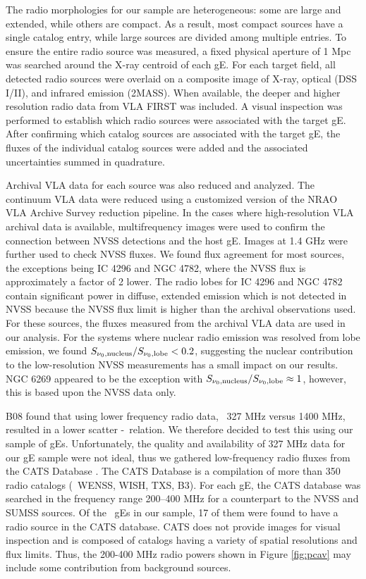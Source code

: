 \documentclass{emulateapj}
\begin{document}
The radio morphologies for our sample are heterogeneous: some are
large and extended, while others are compact. As a result, most
compact sources have a single catalog entry, while large sources are
divided among multiple entries. To ensure the entire radio source was
measured, a fixed physical aperture of 1 Mpc was searched around the
X-ray centroid of each gE. For each target field, all detected radio
sources were overlaid on a composite image of X-ray, optical (DSS
I/II), and infrared emission (2MASS). When available, the deeper and
higher resolution radio data from VLA FIRST was included. A visual
inspection was performed to establish which radio sources were
associated with the target gE. After confirming which catalog sources
are associated with the target gE, the fluxes of the individual
catalog sources were added and the associated uncertainties summed in
quadrature.

Archival VLA data for each source was also reduced and analyzed. The
continuum VLA data were reduced using a customized version of the NRAO
VLA Archive Survey reduction pipeline. In the cases where
high-resolution VLA archival data is available, multifrequency images
were used to confirm the connection between NVSS detections and the
host gE. Images at 1.4 GHz were further used to check NVSS fluxes. We
found flux agreement for most sources, the exceptions being IC 4296
and NGC 4782, where the NVSS flux is approximately a factor of 2
lower. The radio lobes for IC 4296 and NGC 4782 contain significant
power in diffuse, extended emission which is not detected in NVSS
because the NVSS flux limit is higher than the archival observations
used. For these sources, the fluxes measured from the archival VLA
data are used in our analysis. For the systems where nuclear radio
emission was resolved from lobe emission, we found
$S_{\nu_0,\rm{nucleus}} / S_{\nu_0,\rm{lobe}} < 0.2$, suggesting the
nuclear contribution to the low-resolution NVSS measurements has a
small impact on our results. NGC 6269 appeared to be the exception
with $S_{\nu_0,\rm{nucleus}} / S_{\nu_0,\rm{lobe}} \approx 1$,
however, this is based upon the NVSS data only.

B08 found that using lower frequency radio data, \ie\ 327 MHz versus
1400 MHz, resulted in a lower scatter \pjet-\prad\ relation. We
therefore decided to test this using our sample of gEs. Unfortunately,
the quality and availability of 327 MHz data for our gE sample were
not ideal, thus we gathered low-frequency radio fluxes from the CATS
Database \citep{cats}. The CATS Database is a compilation of more than
350 radio catalogs (\eg\ WENSS, WISH, TXS, B3). For each gE, the CATS
database was searched in the frequency range 200--400 MHz for a
counterpart to the NVSS and SUMSS sources. Of the \samp\ gEs in our
sample, 17 of them were found to have a radio source in the CATS
database. CATS does not provide images for visual inspection and is
composed of catalogs having a variety of spatial resolutions and flux
limits. Thus, the 200-400 MHz radio powers shown in Figure
\ref{fig:pcav} may include some contribution from background sources.
\end{document}
